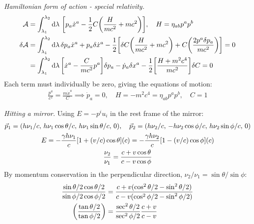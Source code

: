 \documentclass{report}
\begin{document}
\begin{subquests}
	\item \emph{Hamiltonian form of action - special relativity.}
	\begin{align*}
		\mathcal A & = \int_{\lambda_1}^{\lambda_2} \dd{\lambda}\, \bqty{p_a \dot x^a - \frac{1}{2}C\pqty{\frac{H}{mc^2} + mc^2}}, \quad H = \eta_{ab} p^a p^b \\
		\delta\mathcal A & = \int_{\lambda_1}^{\lambda_2} \dd{\lambda} \delta p_a \dot x^a + p_a \delta\dot x^a -\frac{1}{2}\bqty{\delta C\pqty{\frac{H}{mc^2} + mc^2} + C\pqty{\frac{2p^a\delta p_a}{mc^2}}} = 0 \\
		& = \int_{\lambda_1}^{\lambda_2} \dd{\lambda} \bqty{\dot x^a - \frac{C}{mc^2}p^a}\delta p_a - \dot p_a\delta x^a - \frac{1}{2}\bqty{\frac{H + m^2c^4}{mc^2}}\delta C = 0
	\end{align*}
	Each term must individually be zero, giving the equations of motion:
	\begin{gather*}
		\frac{p^a}{c^2} = \frac{m\dot x^a}{C} \implies \dot p_a = 0, \quad H = -m^2c^4 = \eta_{ab}p^a p^b, \quad C=1 
	\end{gather*}

	\item \emph{Hitting a mirror.}
	Using $E = -p^i u_i$ in the rest frame of the mirror:
	\begin{gather*}
		\vec p_1 = \pqty{h\nu_1/c,\, h\nu_1\cos\theta/c,\, h\nu_1\sin\theta/c,\,0}, \quad \vec p_2 = \pqty{h\nu_2/c,\, -h\nu_2\cos\phi/c,\, h\nu_2\sin\phi/c,\,0} \\
		E = -\frac{\gamma h \nu_1}{c}\bqty{1 + (v/c)\cos\theta}\pqty{c} = -\frac{\gamma h \nu_2}{c}\bqty{1 - (v/c)\cos\phi}\pqty{c} \\
		\frac{\nu_2}{\nu_1} = \frac{c + v\cos\theta}{c - v\cos\phi}
	\end{gather*}
	By momentum conservation in the perpendicular direction, $\nu_2/\nu_1 = \sin\theta/\sin\phi$:
	\begin{align*}
		\frac{\sin\theta/2 \cos\theta/2}{\sin\phi/2\cos\phi/2} & = \frac{c + v(\cos^2 \theta/2 - \sin^2\theta/2)}{c - v(\cos^2\phi/2 - \sin^2\phi/2)} \\
		\pqty{\frac{\tan\theta/2}{\tan\phi/2}} & = \frac{\sec^2\theta/2}{\sec^2\phi/2}\frac{c + v}{c - v}
	\end{align*}


\end{subquests}
\end{document}
